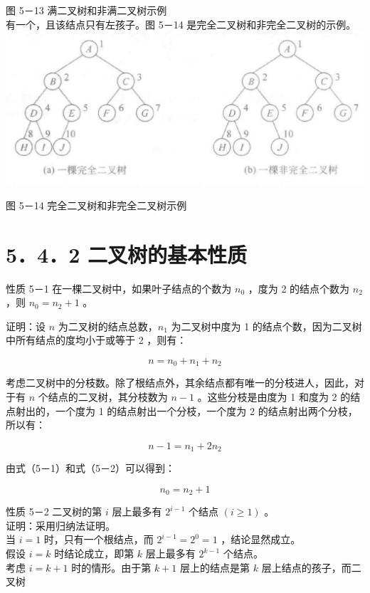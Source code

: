\documentclass[10pt]{article}
\begin{document}
图 5－13 满二叉树和非满二叉树示例\\
有一个，且该结点只有左孩子。图 5－14 是完全二叉树和非完全二叉树的示例。\\
\includegraphics[max width=\textwidth, center]{2025_06_06_704745ea57b15b2333e5g-149(1)}

图 5－14 完全二叉树和非完全二叉树示例

\section*{5．4．2 二叉树的基本性质}
性质 5－1 在一棵二叉树中，如果叶子结点的个数为 $n_{0}$ ，度为 2 的结点个数为 $n_{2}$ ，则 $n_{0}=n_{2}+1$ 。

证明：设 $n$ 为二叉树的结点总数，$n_{1}$ 为二叉树中度为 1 的结点个数，因为二叉树中所有结点的度均小于或等于 2 ，则有：


\begin{equation*}
n=n_{0}+n_{1}+n_{2} \tag{5-1}
\end{equation*}


考虑二叉树中的分枝数。除了根结点外，其余结点都有唯一的分枝进人，因此，对于有 $n$ 个结点的二叉树，其分枝数为 $n-1$ 。这些分枝是由度为 1 和度为 2 的结点射出的，一个度为 1 的结点射出一个分枝，一个度为 2 的结点射出两个分枝，所以有：


\begin{equation*}
n-1=n_{1}+2 n_{2} \tag{5-2}
\end{equation*}


由式（5－1）和式（5－2）可以得到：

$$
n_{0}=n_{2}+1
$$

性质 5－2 二叉树的第 $i$ 层上最多有 $2^{i-1}$ 个结点 $(i \geqslant 1)$ 。\\
证明：采用归纳法证明。\\
当 $i=1$ 时，只有一个根结点，而 $2^{i-1}=2^{0}=1$ ，结论显然成立。\\
假设 $i=k$ 时结论成立，即第 $k$ 层上最多有 $2^{k-1}$ 个结点。\\
考虑 $i=k+1$ 时的情形。由于第 $k+1$ 层上的结点是第 $k$ 层上结点的孩子，而二叉树
\end{document}
